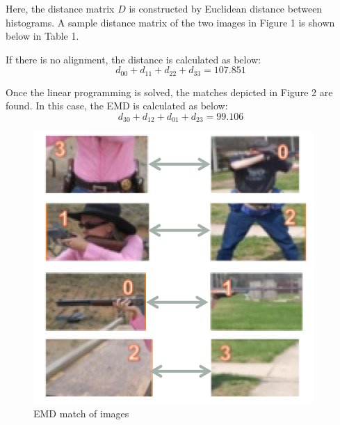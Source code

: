 \noindent Here, the distance matrix $D$ is constructed by Euclidean distance between histograms. A sample distance matrix of the two images in Figure 1 is shown below in Table 1. 

\begin{table}[!ht]
    \begin{center}
    \end{center}
    \caption{Distance matrix}
\end{table}

\noindent If there is no alignment, the distance is calculated as below:
$$d_{00} + d_{11} + d_{22} + d_{33} = 107.851$$

\noindent Once the linear programming is solved, the matches depicted in Figure 2 are found. In this case, the EMD is calculated as below:
$$d_{30} + d_{12} + d_{01} + d_{23} = 99.106$$

\begin{figure}[!ht]
\centering
	\includegraphics[scale = 0.8]{./image_EMD.png}
\caption{EMD match of images}
\end{figure}

